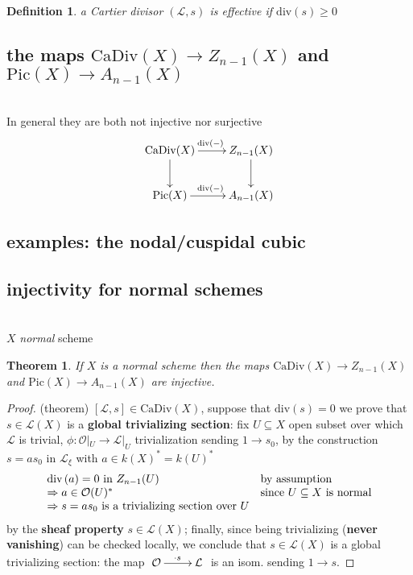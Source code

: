 \documentclass[oneside,a4paper,11pt]{amsbook}
\theoremstyle{pl}
\newtheorem{teo}{Theorem}[chapter]
\theoremstyle{df}
\newtheorem*{dfn}{Definition}
\theoremstyle{rm}
\newcommand{\nline}{
~\\
}%
\newcommand{\pa}[1]{
\left(#1\right)
}
\newcommand{\qa}[1]{
\left[#1\right]
}
\newcommand{\mc}[1]{
\mathcal{#1}
}
\newcommand{\dv}[1]{
\text{div}\pa{#1}
}
\begin{document}
\begin{dfn}
a Cartier divisor $\pa{\mc{L},s}$ is \emph{effective} if $\dv{s}\ge 0$
\end{dfn}

\subsection{the maps $\text{CaDiv}(X)\rightarrow Z_{n-1}(X)$ and $\text{Pic}(X)\rightarrow A_{n-1}(X)$}
\nline
In general they are both not injective nor surjective
\[
\xymatrix{
\text{CaDiv}(X)\ar[r]^{\dv{-}}\ar[d] &Z_{n-1}(X)\ar[d]\\
\text{Pic}(X)\ar[r]^{\dv{-}} &A_{n-1}(X)\\
}
\]

\subsection{examples: the nodal/cuspidal cubic}

\subsection{injectivity for normal schemes}
\nline
$X$ \emph{normal} scheme

\begin{teo}
If $X$ is a normal scheme then the maps $\text{CaDiv}(X)\rightarrow Z_{n-1}(X)$ and $\text{Pic}(X)\rightarrow A_{n-1}(X)$ are injective.
\end{teo}

\begin{proof}(theorem)
$\qa{\mc{L},s}\in\text{CaDiv}(X)$, suppose that $\dv{s}=0$ we prove that $s\in\mc{L}(X)$ is a \textbf{global trivializing section}: fix $U\subseteq X$ open subset over which $\mc{L}$ is trivial, $\phi:\mc{O}|_U\rightarrow\mc{L}|_U$ trivialization sending $1\rightarrow s_0$, by the construction $s=as_0$ in $\mc{L}_\xi$ with $a\in k(X)^*=k(U)^*$
\[
\begin{array}{l l}
\dv{a}=0\text{ in }Z_{n-1}(U) & \text{by assumption}\\
\Rightarrow a\in\mc{O}(U)^* &\text{since $U\subseteq X$ is normal}\\
\Rightarrow s=as_0\text{ is a trivializing section over $U$} &\\
\end{array}
\]
by the \textbf{sheaf property} $s\in\mc{L}(X)$; finally, since being trivializing (\textbf{never vanishing}) can be checked locally, we conclude that $s\in\mc{L}(X)$ is a global trivializing section: the map $\xymatrix{\mc{O}\ar[r]^{\cdot s} &\mc{L}\\}$ is an isom. sending $1\rightarrow s$.
\end{proof}
\end{document}
